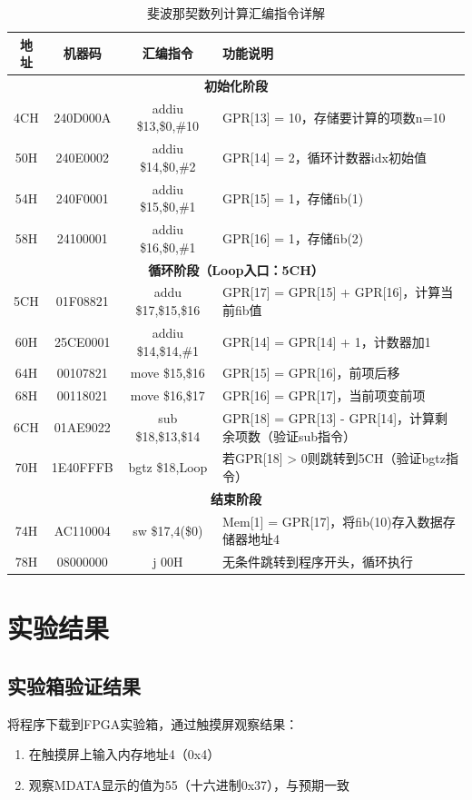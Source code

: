 \documentclass[12pt,a4paper]{article}
\begin{document}
\begin{table}[H]
\centering
\caption{斐波那契数列计算汇编指令详解}
\begin{tabular}{|c|c|c|p{6cm}|}
\hline
地址 & 机器码 & 汇编指令 & 功能说明 \\
\hline
\multicolumn{4}{|c|}{\textbf{初始化阶段}} \\
\hline
4CH & 240D000A & addiu \$13,\$0,\#10 & GPR[13] = 10，存储要计算的项数n=10 \\
50H & 240E0002 & addiu \$14,\$0,\#2 & GPR[14] = 2，循环计数器idx初始值 \\
54H & 240F0001 & addiu \$15,\$0,\#1 & GPR[15] = 1，存储fib(1) \\
58H & 24100001 & addiu \$16,\$0,\#1 & GPR[16] = 1，存储fib(2) \\
\hline
\multicolumn{4}{|c|}{\textbf{循环阶段（Loop入口：5CH）}} \\
\hline
5CH & 01F08821 & addu \$17,\$15,\$16 & GPR[17] = GPR[15] + GPR[16]，计算当前fib值 \\
60H & 25CE0001 & addiu \$14,\$14,\#1 & GPR[14] = GPR[14] + 1，计数器加1 \\
64H & 00107821 & move \$15,\$16 & GPR[15] = GPR[16]，前项后移 \\
68H & 00118021 & move \$16,\$17 & GPR[16] = GPR[17]，当前项变前项 \\
6CH & 01AE9022 & sub \$18,\$13,\$14 & GPR[18] = GPR[13] - GPR[14]，计算剩余项数（验证sub指令） \\
70H & 1E40FFFB & bgtz \$18,Loop & 若GPR[18] > 0则跳转到5CH（验证bgtz指令） \\
\hline
\multicolumn{4}{|c|}{\textbf{结束阶段}} \\
\hline
74H & AC110004 & sw \$17,4(\$0) & Mem[1] = GPR[17]，将fib(10)存入数据存储器地址4 \\
78H & 08000000 & j 00H & 无条件跳转到程序开头，循环执行 \\
\hline
\end{tabular}
\end{table}

\section{实验结果}

\subsection{实验箱验证结果}
将程序下载到FPGA实验箱，通过触摸屏观察结果：
\begin{enumerate}
    \item 在触摸屏上输入内存地址4（0x4）
    \item 观察MDATA显示的值为55（十六进制0x37），与预期一致
\end{enumerate}
\end{document}
